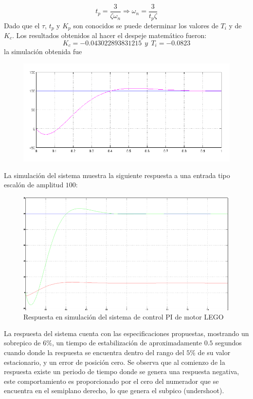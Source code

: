 \documentclass[twocolumn]{IEEEtran}
\begin{document}
\begin{equation}
 t_p = \frac{3}{\zeta \omega _n} \Longrightarrow \omega _n= \frac{3}{t_p \zeta}
\label{ecu4}
\end{equation}
\noindent
Dado que el $\tau$, $t_p$ y $K_p$ son conocidos se puede determinar los valores de $T_i$ y de $K_c$.
Los resultados obtenidos al hacer el despeje matemático fueron:
\begin{equation}
 K_c=-0.043022893831215\ \ y \ \ T_i=-0.0823
\label{ecu6}
\end{equation}
\noindent
la simulación obtenida fue
\begin{figure}[H]
	\centering
		\includegraphics[scale=0.4]{simulation2.png}
	\caption{}
	\label{fig3}
\end{figure}
\noindent
La simulación del sistema muestra la siguiente respuesta a una entrada tipo escalón de amplitud $100$:
\begin{figure}[H]
	\centering
		\includegraphics[scale=0.3]{simulation3.png}
	\caption{Respuesta  en simulación del sistema de control PI de motor LEGO}
	\label{fig5}
\end{figure}
\noindent
La respuesta del sistema cuenta con las especificaciones propuestas, mostrando un sobrepico de $6\%$, un tiempo de estabilización de aproximadamente $0.5$ segundos cuando donde la respuesta se encuentra dentro del rango del $5\%$ de su valor estacionario, y un error de posición cero. Se observa que al comienzo de la respuesta existe un periodo de tiempo donde se genera una respuesta negativa, este comportamiento es proporcionado por el cero del numerador que se encuentra en el semiplano derecho, lo que genera el subpico (undershoot).\\
\end{document}
